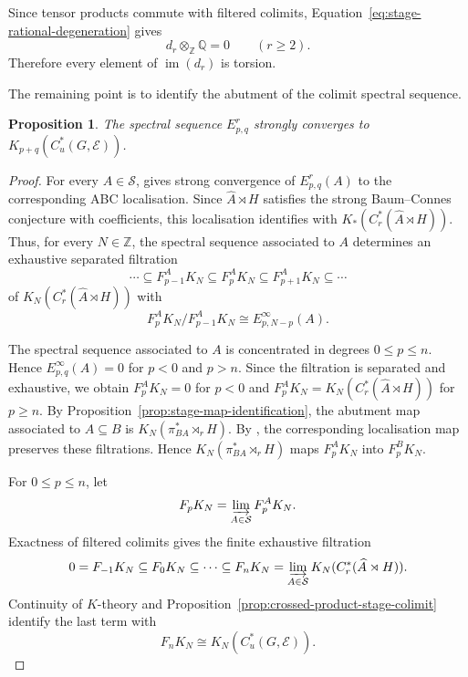 \documentclass[pdflatex,sn-mathphys-num]{sn-jnl}%
\theoremstyle{plain}
\newtheorem{proposition}[theorem]{Proposition}
\theoremstyle{remark}
\theoremstyle{definition}
\numberwithin{equation}{section}
\begin{document}
Since tensor products commute with filtered colimits, Equation~\eqref{eq:stage-rational-degeneration} gives
\begin{equation}
\label{eq:colimit-rational-degeneration}
d_r\otimes_{\mathbb Z}\mathbb Q=0
\qquad
(r\ge2).
\end{equation}
Therefore every element of \( \operatorname{im}(d_r) \) is torsion.

The remaining point is to identify the abutment of the colimit spectral sequence.

\begin{proposition}
\label{prop:directed-colimit-convergence}
The spectral sequence \( E^r_{p,q} \) strongly converges to \( K_{p+q}(C_u^*(G,\mathcal E)) \).
\end{proposition}

\begin{proof}
For every \( A\in\mathcal S \), \cite[Theorem~2.19]{miller2025isomorphisms} gives strong convergence of \( E^r_{p,q}(A) \) to the corresponding ABC localisation. Since \( \widehat A\rtimes H \) satisfies the strong Baum--Connes conjecture with coefficients, this localisation identifies with \( K_*(C_r^*(\widehat A\rtimes H)) \). Thus, for every \( N\in\mathbb Z \), the spectral sequence associated to \( A \) determines an exhaustive separated filtration
\[
\cdots
\subseteq
F_{p-1}^AK_N
\subseteq
F_p^AK_N
\subseteq
F_{p+1}^AK_N
\subseteq
\cdots
\]
of \( K_N(C_r^*(\widehat A\rtimes H)) \) with
\[
F_p^AK_N/F_{p-1}^AK_N
\cong
E^\infty_{p,N-p}(A).
\]

The spectral sequence associated to \( A \) is concentrated in degrees \( 0\leq p\leq n \). Hence \( E^\infty_{p,q}(A)=0 \) for \( p<0 \) and \( p>n \). Since the filtration is separated and exhaustive, we obtain \( F_p^AK_N=0 \) for \( p<0 \) and \( F_p^AK_N=K_N(C_r^*(\widehat A\rtimes H)) \) for \( p\ge n \). By Proposition~\ref{prop:stage-map-identification}, the abutment map associated to \( A\subseteq B \) is \( K_N(\pi_{BA}^*\rtimes_rH) \). By \cite[Lemma~6.8]{miller2025isomorphisms}, the corresponding localisation map preserves these filtrations. Hence \( K_N(\pi_{BA}^*\rtimes_rH) \) maps \( F_p^AK_N \) into \( F_p^BK_N \).

For \( 0\le p\le n \), let
\[
F_pK_N
=
\varinjlim_{A\in\mathcal S}F_p^AK_N.
\]
Exactness of filtered colimits gives the finite exhaustive filtration
\[
0
=
F_{-1}K_N
\subseteq
F_0K_N
\subseteq
\cdots
\subseteq
F_nK_N
=
\varinjlim_{A\in\mathcal S}
K_N(C_r^*(\widehat A\rtimes H)).
\]
Continuity of \( K \)-theory and Proposition~\ref{prop:crossed-product-stage-colimit} identify the last term with
\begin{equation}
\label{eq:colimit-abutment-group}
F_nK_N
\cong
K_N(C_u^*(G,\mathcal E)).
\end{equation}


\end{proof}
\end{document}
